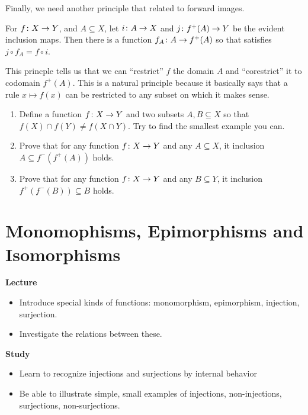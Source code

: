 Finally, we need another principle that related to forward images.

\begin{principle}
	For ${f}\colon{X}\to{Y}$, and $A\subseteq X$, let ${i}\colon{A}\to{X}$ and ${j}\colon{f^+(A)}\to{Y}$ be the evident inclusion maps. Then there is a function ${f_A}\colon{A}\to{f^+(A)}$ so that satisfies $j\circ f_A = f\circ i$.  
\end{principle} 

This princple tells us that we can ``restrict'' $f$ the domain $A$ and ``corestrict'' it to codomain $f^+(A)$. This is a natural principle because it basically says that a rule $x\mapsto f(x)$ can be restricted to any subset on which it makes sense.

\begin{exercises}
	\begin{enumerate}
		\item Define a function ${f}\colon{X}\to{Y}$ and two subsets $A,B\subseteq X$ so that $f(X)\cap f(Y) \neq f(X\cap Y)$. Try to find the smallest example you can.
		\item Prove that for any function ${f}\colon{X}\to{Y}$ and any $A\subseteq X$, it inclusion $A\subseteq f^-(f^+(A))$ holds.
		\item Prove that for any function ${f}\colon{X}\to{Y}$ and any $B\subseteq Y$, it inclusion $f^+(f^-(B))\subseteq B$ holds.
	\end{enumerate}
\end{exercises}

\chapter{Monomophisms, Epimorphisms and Isomorphisms}

\begin{goals}
	\noindent\textbf{Lecture}
	\begin{itemize}
		\item Introduce special kinds of functions: monomorphism, epimorphism, injection, surjection.
		\item Investigate the relations between these.
	\end{itemize}
	
	\noindent\textbf{Study}
	\begin{itemize}
		\item Learn to recognize injections and surjections by internal behavior
		\item Be able to illustrate simple, small examples of injections, non-injections, surjections, non-surjections.
	\end{itemize}
\end{goals}


